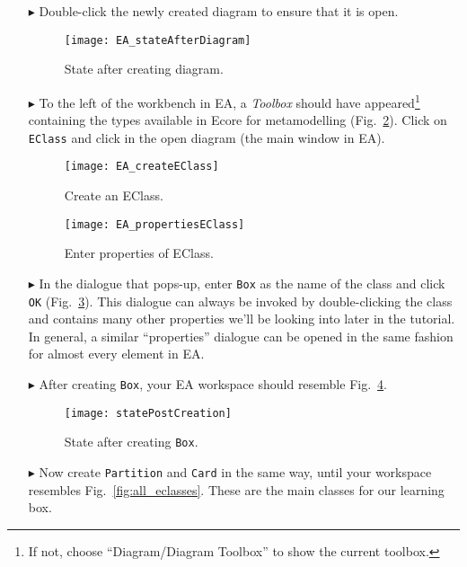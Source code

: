 \begin{enumerate}
\item[$\blacktriangleright$] Double-click the newly created diagram to ensure that it is open.

\begin{figure}[htbp]
	\centering
  \texttt{[image: EA\_stateAfterDiagram]}
	\caption{State after creating diagram.}
	\label{fig:diagram_completed}
\end{figure}

\item[$\blacktriangleright$] To the left of the workbench in EA, a \emph{Toolbox} should have appeared\footnote{If not, choose ``Diagram/Diagram Toolbox'' to show the current toolbox.} containing the types available in Ecore for metamodelling (Fig.~\ref{fig:eclass}).
Click on \texttt{EClass} and click in the open diagram (the main window in EA).

\begin{figure}[htbp]
	\centering
  \texttt{[image: EA\_createEClass]}
	\caption{Create an EClass.}
	\label{fig:eclass}
\end{figure}

\begin{figure}[htbp]
	\centering
  \texttt{[image: EA\_propertiesEClass]}
	\caption{Enter properties of EClass.}
	\label{fig:eclass_properties}
\end{figure}

\item[$\blacktriangleright$] In the dialogue that pops-up, enter \texttt{Box} as the name of the class and click \texttt{OK} (Fig.~\ref{fig:eclass_properties}).
This dialogue can always be invoked by double-clicking the class and contains many other properties we'll be looking into later in the tutorial.
In general, a similar ``properties'' dialogue can be opened in the same fashion for almost every element in EA.

\item[$\blacktriangleright$] After creating \texttt{Box}, your EA workspace should resemble Fig.~\ref{fig:eclass_completed}.

\begin{figure}[htbp]
	\centering
  \texttt{[image: statePostCreation]}
	\caption{State after creating \texttt{Box}.}
	\label{fig:eclass_completed}
\end{figure}


\item[$\blacktriangleright$] Now create \texttt{Partition} and \texttt{Card} in the same way, until your workspace resembles Fig.~\ref{fig:all_eclasses}.
These are the main classes for our learning box.


\end{enumerate}
